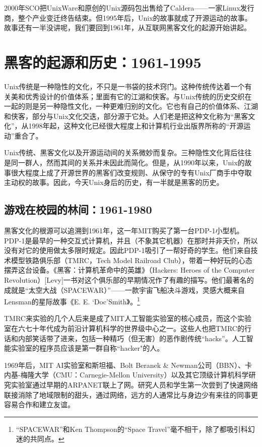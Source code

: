 \documentclass[12pt,oneside]{book}
\begin{document}
\begin{common-format}
2000年SCO把UnixWare和原创的Unix源码包出售给了Caldera——一家Linux发行商，整个产业变迁终告结束。但1995年后，Unix的故事就成了开源运动的故事。故事还有一半没讲呢，我们要回到1961年，从互联网黑客文化的起源开始讲起。

\section{黑客的起源和历史：1961-1995}
Unix传统是一种隐性的文化，不只是一书袋的技术窍门。这种传统传达着一个有关美和优秀设计的价值体系；里面有它的江湖和侠客。与Unix传统的历史交织在一起的则是另一种隐性文化，一种更难归别的文化。它也有自己的价值体系、江湖和侠客，部分与Unix文化交迭，部分源于它处。人们老是把这种文化称为“黑客文化”，从1998年起，这种文化已经很大程度上和计算机行业出版界所称的“开源运动”重合了。

Unix传统、黑客文化以及开源运动间的关系微妙而复杂。三种隐性文化背后往往是同一群人，然而其间的关系并未因此而简化。但是，从1990年以来，Unix的故事很大程度上成了开源世界的黑客们改变规则、从保守的专有Unix厂商手中夺取主动权的故事。因此，今天Unix身后的历史，有一半就是黑客的历史。


\subsection{游戏在校园的林间：1961-1980}
黑客文化的根源可以追溯到1961年，这一年MIT购买了第一台PDP-1小型机。PDP-1是最早的一种交互式计算机，并且（不象其它机器）在那时并非天价，所以没有对它的使用做太多限时规定。因此PDP-1吸引了一帮好奇的学生。他们来自技术模型铁路俱乐部（TMRC，Tech Model Railroad Club），带着一种好玩的心态摆弄这台设备。《黑客：计算机革命中的英雄》（Hackers:  Heroes of the Computer Revolution）[Levy]一书对这个俱乐部的早期情况作了有趣的描写。他们最著名的成就是“太空大战（SPACEWAR）”——一款宇宙飞船决斗游戏，灵感大概来自Lensman的星际故事《E. E. ‘Doc’Smith》。\footnote{“SPACEWAR”和Ken Thompson的“Space Travel”毫不相干，除了都吸引科幻迷的共同点。}

TMRC来实验的几个人后来是成了MIT人工智能实验室的核心成员，而这个实验室在六七十年代成为前沿计算机科学的世界级中心之一。这些人也把TMRC的行话和内部笑话带了进来，包括一种精巧（但无害）的恶作剧传统“hacks”。人工智能实验室的程序员应该是第一群自称“hacker"的人。

1969年后，MIT AI实验室和斯坦福、Bolt Beranek \& Newman公司（BBN）、卡内基-梅隆大学（CMU：Carnegie-Mellon University）以及其它顶级计算机科学研究实验室通过早期的ARPANET联上了网。研究人员和学生第一次尝到了快速网络联接消除了地域限制的甜头，通过网络，远方的人通常比与身边少有来往的同事更容易合作和建立友谊。


\end{common-format}
\end{document}
